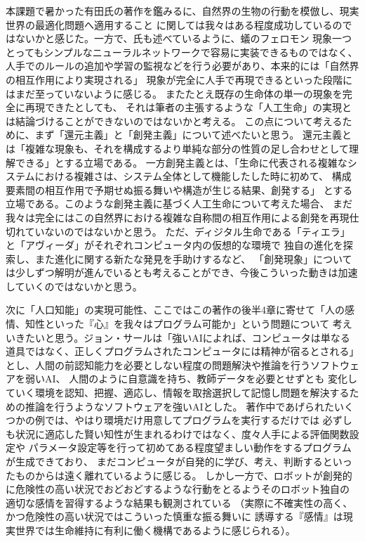 \documentclass[uplatex]{jsarticle}
\begin{document}
本課題で暑かった有田氏の著作を鑑みるに、自然界の生物の行動を模倣し、現実世界の最適化問題へ適用すること
に関しては我々はある程度成功しているのではないかと感じた。一方で、氏も述べているように、蟻のフェロモン
現象一つとってもシンプルなニューラルネットワークで容易に実装できるものではなく、
人手でのルールの追加や学習の監視などを行う必要があり、本来的には「自然界の相互作用により実現される」
現象が完全に人手で再現できるといった段階にはまだ至っていないように感じる。
またたとえ既存の生命体の単一の現象を完全に再現できたとしても、
それは筆者の主張するような「人工生命」の実現とは結論づけることができないのではないかと考える。
この点について考えるために、まず「還元主義」と「創発主義」について述べたいと思う。
還元主義とは「複雑な現象も、それを構成するより単純な部分の性質の足し合わせとして理解できる」とする立場である。
一方創発主義とは、「生命に代表される複雑なシステムにおける複雑さは、システム全体として機能したした時に初めて、
構成要素間の相互作用で予期せぬ振る舞いや構造が生じる結果、創発する」
とする立場である。このような創発主義に基づく人工生命について考えた場合、
まだ我々は完全にはこの自然界における複雑な自称間の相互作用による創発を再現仕切れていないのではないかと思う。
ただ、ディジタル生命である「ティエラ」と「アヴィーダ」がそれぞれコンピュータ内の仮想的な環境で
独自の進化を探索し、また進化に関する新たな発見を手助けするなど、
「創発現象」については少しずつ解明が進んでいるとも考えることができ、今後こういった動きは加速していくのではないかと思う。

次に「人口知能」の実現可能性、ここではこの著作の後半4章に寄せて「人の感情、知性といった『心』を我々はプログラム可能か」という問題について
考えいきたいと思う。ジョン・サールは「強いAIによれば、コンピュータは単なる道具ではなく、正しくプログラムされたコンピュータには精神が宿るとされる」
とし、人間の前認知能力を必要としない程度の問題解決や推論を行うソフトウェアを弱いAI、
人間のように自意識を持ち、教師データを必要とせずとも
変化していく環境を認知、把握、適応し、情報を取捨選択して記憶し問題を解決するための推論を行うようなソフトウェアを強いAIとした。
著作中であげられたいくつかの例では、やはり環境だけ用意してプログラムを実行するだけでは
必ずしも状況に適応した賢い知性が生まれるわけではなく、度々人手による評価関数設定や
パラメータ設定等を行って初めてある程度望ましい動作をするプログラムが生成できており、
まだコンピュータが自発的に学び、考え、判断するといったものからは遠く離れているように感じる。
しかし一方で、ロボットが創発的に危険性の高い状況でおどおどするような行動をとるようそのロボット独自の
適切な感情を習得するような結果も観測されている
（実際に不確実性の高く、かつ危険性の高い状況ではこういった慎重な振る舞いに
誘導する『感情』は現実世界では生命維持に有利に働く機構であるように感じられる）。
\end{document}
